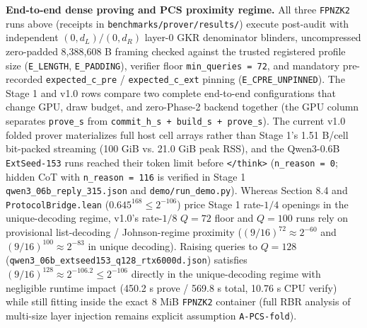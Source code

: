 \documentclass[10pt]{article}
\begin{document}
\textbf{End-to-end dense proving and PCS proximity regime.} All three \texttt{FPNZK2} runs above (receipts in \texttt{benchmarks/prover/results/}) execute post-audit with independent $(0, d_L)/(0, d_R)$ layer-0 GKR denominator blinders, uncompressed zero-padded 8,388,608 B framing checked against the trusted registered profile size (\texttt{E\_\allowbreak{}LENGTH}, \texttt{E\_\allowbreak{}PADDING}), verifier floor \texttt{min\_\allowbreak{}queries = 72}, and mandatory pre-recorded \texttt{expected\_\allowbreak{}c\_\allowbreak{}pre} / \texttt{expected\_\allowbreak{}c\_\allowbreak{}ext} pinning (\texttt{E\_\allowbreak{}CPRE\_\allowbreak{}UNPINNED}). The Stage 1 and v1.0 rows compare two complete end-to-end configurations that change GPU, draw budget, and zero-Phase-2 backend together (the GPU column separates \texttt{prove\_\allowbreak{}s} from \texttt{commit\_\allowbreak{}h\_\allowbreak{}s + build\_\allowbreak{}s + prove\_\allowbreak{}s}). The current v1.0 folded prover materializes full host cell arrays rather than Stage 1's 1.51 B/cell bit-packed streaming (100 GiB vs. 21.0 GiB peak RSS), and the Qwen3-0.6B \texttt{ExtSeed-153} runs reached their token limit before \texttt{</think>} (\texttt{n\_\allowbreak{}reason = 0}; hidden CoT with \texttt{n\_\allowbreak{}reason = 116} is verified in Stage 1 \texttt{qwen3\_\allowbreak{}06b\_\allowbreak{}reply\_\allowbreak{}315.\allowbreak{}json} and \texttt{demo/run\_\allowbreak{}demo.\allowbreak{}py}). Whereas Section 8.4 and \texttt{ProtocolBridge.\allowbreak{}lean} ($0.645^{168} \le 2^{-106}$) price Stage 1 rate-$1/4$ openings in the unique-decoding regime, v1.0's rate-$1/8$ $Q=72$ floor and $Q=100$ runs rely on provisional list-decoding / Johnson-regime proximity ($(9/16)^{72}\approx 2^{-60}$ and $(9/16)^{100}\approx 2^{-83}$ in unique decoding). Raising queries to \textbf{$Q=128$} (\texttt{qwen3\_\allowbreak{}06b\_\allowbreak{}extseed153\_\allowbreak{}q128\_\allowbreak{}rtx6000d.\allowbreak{}json}) satisfies $(9/16)^{128}\approx 2^{-106.2} \le 2^{-106}$ directly in the unique-decoding regime with negligible runtime impact (450.2 s prove / 569.8 s total, 10.76 s CPU verify) while still fitting inside the exact 8 MiB \texttt{FPNZK2} container (full RBR analysis of multi-size layer injection remains explicit assumption \texttt{A-PCS-fold}).
\end{document}
